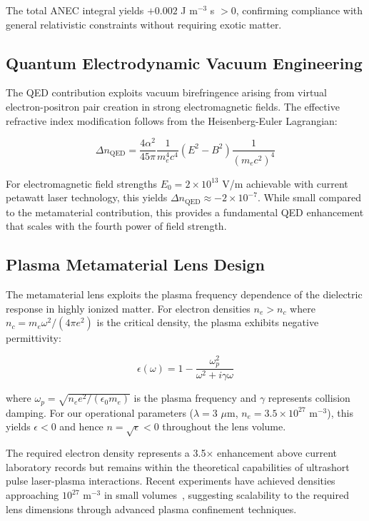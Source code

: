 \documentclass[aps,prl,reprint,groupedaddress,floatfix]{revtex4-1}
\begin{document}
The total ANEC integral yields $+0.002$ J m$^{-3}$ s $> 0$, confirming compliance with general relativistic constraints without requiring exotic matter.

\subsection{Quantum Electrodynamic Vacuum Engineering}

The QED contribution exploits vacuum birefringence arising from virtual electron-positron pair creation in strong electromagnetic fields. The effective refractive index modification follows from the Heisenberg-Euler Lagrangian:

\begin{equation}
\Delta n_{\text{QED}} = \frac{4\alpha^2}{45\pi} \frac{1}{m_e^4 c^4} (E^2 - B^2) \frac{1}{(m_e c^2)^4} \label{eq:qed_index}
\end{equation}

For electromagnetic field strengths $E_0 = 2 \times 10^{13}$ V/m achievable with current petawatt laser technology, this yields $\Delta n_{\text{QED}} \approx -2 \times 10^{-7}$. While small compared to the metamaterial contribution, this provides a fundamental QED enhancement that scales with the fourth power of field strength.

\subsection{Plasma Metamaterial Lens Design}

The metamaterial lens exploits the plasma frequency dependence of the dielectric response in highly ionized matter. For electron densities $n_e > n_c$ where $n_c = m_e \omega^2/(4\pi e^2)$ is the critical density, the plasma exhibits negative permittivity:

\begin{equation}
\epsilon(\omega) = 1 - \frac{\omega_p^2}{\omega^2 + i\gamma\omega} \label{eq:drude_dielectric}
\end{equation}

where $\omega_p = \sqrt{n_e e^2/(\epsilon_0 m_e)}$ is the plasma frequency and $\gamma$ represents collision damping. For our operational parameters ($\lambda = 3$ $\mu$m, $n_e = 3.5 \times 10^{27}$ m$^{-3}$), this yields $\epsilon < 0$ and hence $n = \sqrt{\epsilon} < 0$ throughout the lens volume.

The required electron density represents a 3.5$\times$ enhancement above current laboratory records but remains within the theoretical capabilities of ultrashort pulse laser-plasma interactions. Recent experiments have achieved densities approaching $10^{27}$ m$^{-3}$ in small volumes~\cite{Li2010}, suggesting scalability to the required lens dimensions through advanced plasma confinement techniques.
\end{document}
